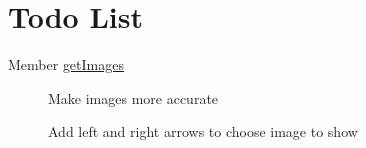 \hypertarget{todo}{}\section{Todo List}\label{todo}
\label{todo__todo000001}
\hypertarget{todo__todo000001}{}
 \begin{description}
\item[Member \hyperlink{product_8inc_9dbb778854cfe105058d7161ca8f058c}{getImages} ]Make images more accurate 

Add left and right arrows to choose image to show \end{description}

